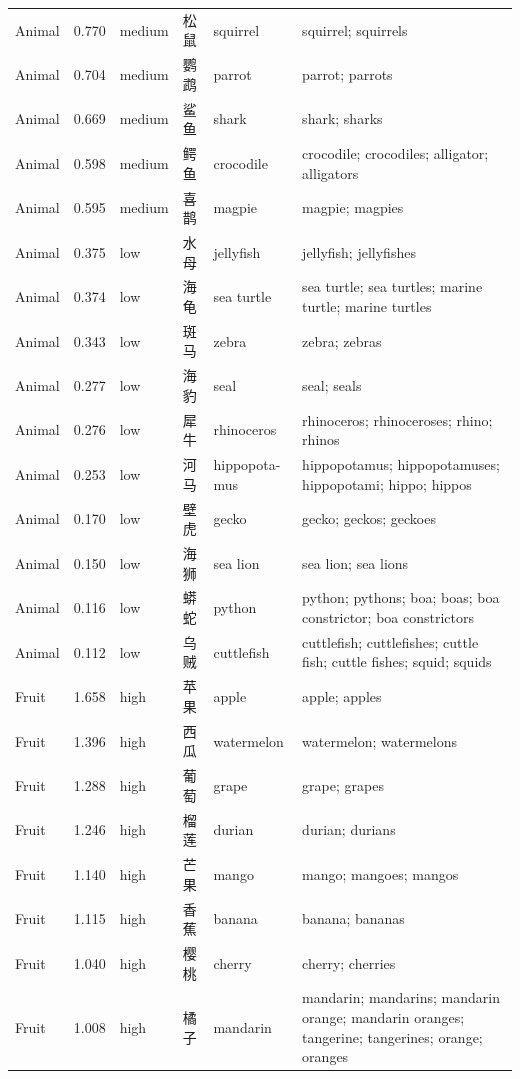 {\begin{longtable}[c]{@{}>{\raggedright\arraybackslash}p{1.85cm}l l l>{\raggedright\arraybackslash}p{1.85cm}>{\raggedright\arraybackslash}p{8.10cm}@{}}
Animal & 0.770 & medium & 松鼠 & squirrel & squirrel; squirrels \\
Animal & 0.704 & medium & 鹦鹉 & parrot & parrot; parrots \\
Animal & 0.669 & medium & 鲨鱼 & shark & shark; sharks \\
Animal & 0.598 & medium & 鳄鱼 & crocodile & crocodile; crocodiles; alligator; alligators \\
Animal & 0.595 & medium & 喜鹊 & magpie & magpie; magpies \\
Animal & 0.375 & low & 水母 & jellyfish & jellyfish; jellyfishes \\
Animal & 0.374 & low & 海龟 & sea turtle & sea turtle; sea turtles; marine turtle; marine turtles \\
Animal & 0.343 & low & 斑马 & zebra & zebra; zebras \\
Animal & 0.277 & low & 海豹 & seal & seal; seals \\
Animal & 0.276 & low & 犀牛 & rhinoceros & rhinoceros; rhinoceroses; rhino; rhinos \\
Animal & 0.253 & low & 河马 & hippopota-\newline mus & hippopotamus; hippopotamuses; hippopotami; hippo; hippos \\
Animal & 0.170 & low & 壁虎 & gecko & gecko; geckos; geckoes \\
Animal & 0.150 & low & 海狮 & sea lion & sea lion; sea lions \\
Animal & 0.116 & low & 蟒蛇 & python & python; pythons; boa; boas; boa constrictor; boa constrictors \\
Animal & 0.112 & low & 乌贼 & cuttlefish & cuttlefish; cuttlefishes; cuttle fish; cuttle fishes; squid; squids \\
Fruit & 1.658 & high & 苹果 & apple & apple; apples \\
Fruit & 1.396 & high & 西瓜 & watermelon & watermelon; watermelons \\
Fruit & 1.288 & high & 葡萄 & grape & grape; grapes \\
Fruit & 1.246 & high & 榴莲 & durian & durian; durians \\
Fruit & 1.140 & high & 芒果 & mango & mango; mangoes; mangos \\
Fruit & 1.115 & high & 香蕉 & banana & banana; bananas \\
Fruit & 1.040 & high & 樱桃 & cherry & cherry; cherries \\
Fruit & 1.008 & high & 橘子 & mandarin & mandarin; mandarins; mandarin orange; mandarin oranges; tangerine; tangerines; orange; oranges \\

\end{longtable}}
